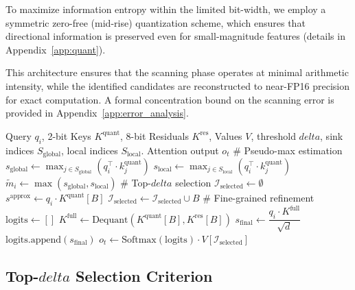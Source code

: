 \documentclass[]{mosi}
\def\bm#1{#1}%
\def\delta{delta}%
\theoremstyle{plain}
\theoremstyle{definition}
\theoremstyle{remark}
\begin{document}
To maximize information entropy within the limited bit-width, we employ a symmetric zero-free (mid-rise) quantization scheme, which ensures that directional information is preserved even for small-magnitude features (details in Appendix~\ref{app:quant}).

This architecture ensures that the scanning phase operates at minimal arithmetic intensity, while the identified candidates are reconstructed to near-FP16 precision for exact computation. A formal concentration bound on the scanning error is provided in Appendix~\ref{app:error_analysis}.



\begin{algorithm}[tb]
   \caption{FFD Decoding with Hybrid Quantization}
   \label{alg:top_delta}
\begin{algorithmic}[1]
    Query $\bm{q}_i$, 2-bit Keys $\bm{K}^\text{quant}$, 8-bit Residuals $\bm{K}^\text{res}$, Values $\bm{V}$, threshold $\delta$, sink indices $S_\text{global}$, local indices $S_\text{local}$.
    Attention output $o_t$
   \STATE \# Pseudo-max estimation
   \STATE $s_\text{global} \gets \max_{j \in S_\text{global}}\left(\bm{q}_i^\top\cdot \bm{k}^\text{quant}_j\right)$
   \STATE $s_\text{local} \gets \max_{j \in S_\text{local}}\left(\bm{q}_i^\top\cdot \bm{k}^\text{quant}_j\right)$
   \STATE $\tilde{m}_i \gets \max\left(s_\text{global}, s_\text{local}\right)$
   \STATE 
   \STATE \# Top-$\delta$ selection
   \STATE $\mathcal{I}_\text{selected} \gets \emptyset$
       \STATE $s^\text{approx} \gets \bm{q}_i \cdot \bm{K}^\text{quant}[B]$
       \IF{$\max(s^\text{approx}) \ge \tilde{m}_i - \delta$}
           \STATE $\mathcal{I}_\text{selected} \gets \mathcal{I}_\text{selected} \cup B$
       \ENDIF
   \ENDFOR
   \STATE 
   \STATE \# Fine-grained refinement
   \STATE $\text{logits} \gets []$
       \STATE $\bm{K}^\text{full} \gets \text{Dequant}(\bm{K}^\text{quant}[B], \bm{K}^\text{res}[B])$
       \STATE $s_\text{final} \gets \dfrac{\bm{q}_i \cdot \bm{K}^\text{full}}{\sqrt{d}}$
       \STATE $\text{logits}.\text{append}(s_\text{final})$
   \ENDFOR
   \STATE $o_t \gets \text{Softmax}(\text{logits}) \cdot V[\mathcal{I}_\text{selected}]$
\end{algorithmic}
\end{algorithm}




\subsection{Top-$\bm\delta$ Selection Criterion}
\label{sec:ffd_selection}
\end{document}
